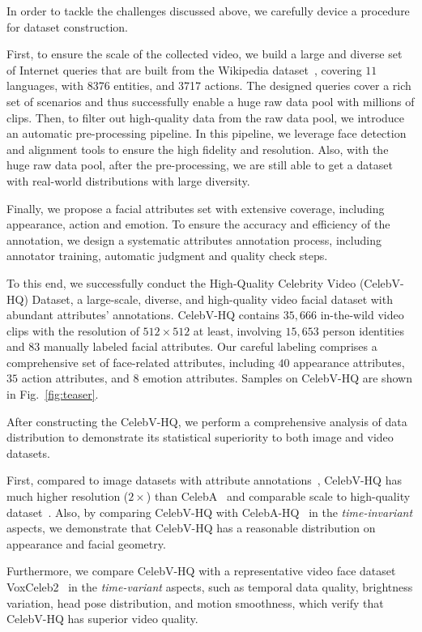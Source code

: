In order to tackle the challenges discussed above, we carefully device a procedure for dataset construction.

First, to ensure the scale of the collected video, we build a large and diverse set of Internet queries that are built from the Wikipedia dataset~\cite{wikidataset}, covering $11$ languages, with 8376 entities, and 3717 actions. The designed queries cover a rich set of scenarios and thus successfully enable a huge raw data pool with millions of clips. Then, to filter out high-quality data from the raw data pool, we introduce an automatic pre-processing pipeline. In this pipeline, we leverage face detection and alignment tools to ensure the high fidelity and resolution. Also, with the huge raw data pool, after the pre-processing, we are still able to get a dataset with real-world distributions with large diversity.

Finally, we propose a facial attributes set with extensive coverage, including appearance, action and emotion. To ensure the accuracy and efficiency of the annotation, we design a systematic attributes annotation process, including annotator training, automatic judgment and quality check steps.

To this end, we successfully conduct the High-Quality Celebrity Video (CelebV-HQ) Dataset, a large-scale, diverse, and high-quality video facial dataset with abundant attributes' annotations. CelebV-HQ contains $35,666$ in-the-wild video clips with the resolution of $512\times512$ at least, involving $15,653$ person identities and $83$ manually labeled facial attributes. Our careful labeling comprises a comprehensive set of face-related attributes, including $40$ appearance attributes, $35$ action attributes, and $8$ emotion attributes. Samples on CelebV-HQ are shown in Fig.~\ref{fig:teaser}.

After constructing the CelebV-HQ, we perform a comprehensive analysis of data distribution to demonstrate its statistical superiority to both image and video datasets. 

First, compared to image datasets with attribute annotations~\cite{celeba15,celebahq}, CelebV-HQ has much higher resolution ($2\times$) than CelebA~\cite{celeba15} and comparable scale to high-quality dataset~\cite{celebahq}. Also, by comparing CelebV-HQ with CelebA-HQ~\cite{celebahq} in the \textit{time-invariant} aspects, we demonstrate that CelebV-HQ has a reasonable distribution on appearance and facial geometry.

Furthermore, we compare CelebV-HQ with a representative video face dataset VoxCeleb2~\cite{vox2} in the \textit{time-variant} aspects, such as temporal data quality, brightness variation, head pose distribution, and motion smoothness, which verify that CelebV-HQ has superior video quality.

